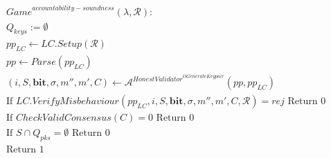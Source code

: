 \begin{align*}
& \mathit{Game}^{\mathit{accountability-soundness}}(\lambda, \mathcal{R}): \\
&  Q_{\mathit{keys}} := \emptyset  \\ 
& \mathit{pp_{\mathit{LC}}} \leftarrow \mathit{LC.Setup}( \mathcal{R}) \\
& \mathit{pp} \leftarrow \mathit{Parse}(\mathit{pp_{\mathit{LC}}}) \\
&  (i, S, \mathbf{bit}, \sigma, m'', m', C) \leftarrow \mathcal{A}^{\mathit{HonestValidator}^{\mathit{OGenerateKeypair}} \mathit{}}(\mathit{pp},\mathit{pp_{\mathit{LC}}})   \\
& \text{If } \mathit{LC.VerifyMisbehaviour}(\mathit{pp_{\mathit{LC}}}, i, S, \mathbf{bit}, \sigma, m'', m', C, \mathcal{R}) = \mathit{rej} \text{ Return } 0 \\ 
&  \text{If } \mathit{CheckValidConsensus}(C) =0 \text{ Return } 0 \\
& \text{If } S \cap Q_{pks}=\emptyset \text{ Return } 0 \\
& \text{Return } 1
\end{align*}

